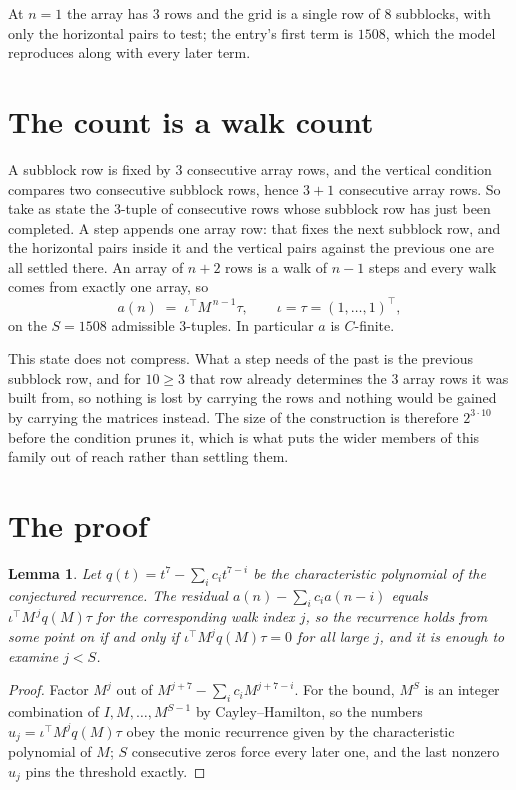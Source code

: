 \documentclass[11pt,a4paper]{article}
\theoremstyle{plain}
\newtheorem{lemma}[theorem]{Lemma}
\theoremstyle{definition}
\begin{document}
At $n=1$ the array has $3$ rows and the grid is a single row of $8$
subblocks, with only the horizontal pairs to test; the entry's first term is
$1508$, which the model reproduces along with every later term.

\section{The count is a walk count}

A subblock row is fixed by $3$ consecutive array rows, and the vertical condition compares
two consecutive subblock rows, hence $3+1$ consecutive array rows. So take as state the
$3$-tuple of consecutive rows whose subblock row has just been completed. A step appends one
array row: that fixes the next subblock row, and the horizontal pairs inside it and the
vertical pairs against the previous one are all settled there. An array of $n+2$ rows is
a walk of $n-1$ steps and every walk comes from exactly one array, so
\[
a(n)\;=\;\iota^{\!\top}M^{\,n-1}\tau,\qquad\iota=\tau=(1,\dots,1)^{\!\top},
\]
on the $S=1508$ admissible $3$-tuples. In particular $a$ is $C$-finite.

This state does not compress. What a step needs of the past is the previous subblock row, and
for $10\ge3$ that row already determines the $3$ array rows it was built from, so nothing
is lost by carrying the rows and nothing would be gained by carrying the matrices instead. The
size of the construction is therefore $2^{3\cdot10}$ before the condition prunes
it, which is what puts the wider members of this family out of reach rather than settling them.

\section{The proof}

\begin{lemma}\label{lem:crit}
Let $q(t)=t^{7}-\sum_i c_it^{7-i}$ be the characteristic polynomial of the
conjectured recurrence. The residual $a(n)-\sum_ic_ia(n-i)$ equals
$\iota^{\!\top}M^{\,j}q(M)\tau$ for the corresponding walk index $j$, so the recurrence
holds from some point on if and only if $\iota^{\!\top}M^{j}q(M)\tau=0$ for all large $j$,
and it is enough to examine $j<S$.
\end{lemma}

\begin{proof}
Factor $M^{j}$ out of $M^{j+7}-\sum_ic_iM^{j+7-i}$. For the bound, $M^{S}$
is an integer combination of $I,M,\dots,M^{S-1}$ by Cayley--Hamilton, so the numbers
$u_j=\iota^{\!\top}M^{j}q(M)\tau$ obey the monic recurrence given by the characteristic
polynomial of $M$; $S$ consecutive zeros force every later one, and the last nonzero $u_j$
pins the threshold exactly.
\end{proof}
\end{document}
